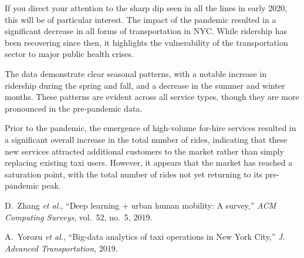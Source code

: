 \documentclass[conference]{IEEEtran}
\begin{document}
If you direct your attention to the sharp dip seen in all the lines in early 2020, this will be of particular interest.
The impact of the pandemic resulted in a significant decrease in all forms of transportation in NYC. While ridership has
been recovering since then, it highlights the vulnerability of the transportation sector to major public health crises.

The data demonstrate clear seasonal patterns, with a notable increase in ridership during the spring and fall, and a
decrease in the summer and winter months. These patterns are evident across all service types, though they are more
pronounced in the pre-pandemic data.

Prior to the pandemic, the emergence of high-volume for-hire services resulted in a significant overall increase in the
total number of rides, indicating that these new services attracted additional customers to the market rather than
simply replacing existing taxi users. However, it appears that the market has reached a saturation point, with the total
number of rides not yet returning to its pre-pandemic peak.


\begin{thebibliography}{00}

  D.~Zhang \emph{et al.}, “Deep learning + urban human mobility: A survey,”
  \emph{ACM Computing Surveys}, vol.~52, no.~5, 2019.

  A.~Yorozu \emph{et al.}, “Big-data analytics of taxi operations in New York
  City,” \emph{J. Advanced Transportation}, 2019.


\end{thebibliography}
\end{document}
